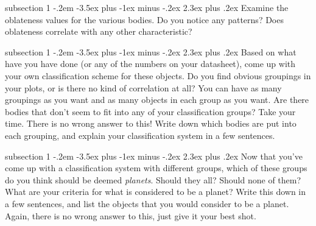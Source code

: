 \documentclass[12pt]{article}
\makeatletter
\newenvironment{problem}{\@startsection
       {subsection}
       {1}
       {-.2em}
       {-3.5ex plus -1ex minus -.2ex}
       {2.3ex plus .2ex}
       {\pagebreak[3]%
       \normalsize\bf\noindent{Problem }
       }
       }
       {%
       }
\makeatother
\begin{document}
\begin{problem}{ }
\indent\indent  Examine the oblateness values for the various bodies. Do you notice any patterns? Does oblateness correlate with any other characteristic?
\end{problem}

\begin{problem}{ }
\indent\indent Based on what have you have done (or any of the numbers on your datasheet), 
come up with your own classification
scheme for these objects.  Do you find obvious groupings in your plots, or
is there no kind of correlation at all?  You can have as many groupings as 
you want and as many objects in each group as you want.  Are there bodies 
that don't seem to fit into any of your classification groups? 
Take your time. There is no wrong answer to this!
Write down which bodies are put into each grouping, and explain your 
classification system in a few sentences.
\end{problem}

\begin{problem}{ }
\indent\indent Now that you've come up with a classification system with different groups,  
which of these groups do you think should be deemed \emph{planets}.  Should 
they all?  Should none of them?  What are your criteria for what is considered
to be a planet?  Write this down in a few sentences, and list the objects
that you would consider to be a planet.  Again, there is no wrong answer to 
this, just give it your best shot.
\end{problem}
\end{document}
